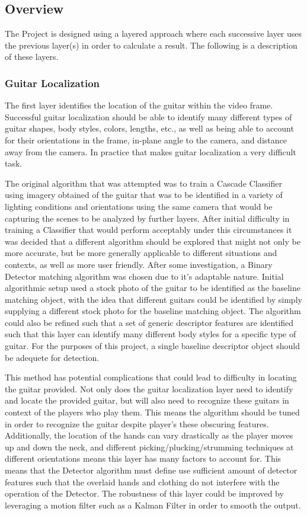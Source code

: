 \subsection{Overview}
The \project Project is designed using a layered approach where each successive layer
uses the previous layer(s) in order to calculate a result.
The following is a description of these layers.
\subsubsection{Guitar Localization}
The first layer identifies the location of the guitar within the video frame.
Successful guitar localization should be able to identify many different types of
guitar shapes, body styles, colors, lengths, etc., as well as being able to account for
their orientations in the frame, in-plane angle to the camera, and distance away from the camera.
In practice that makes guitar localization a very difficult task.
\par
The original algorithm that was attempted was to train a Cascade Classifier using imagery obtained
of the guitar that was to be identified in a variety of lighting conditions and orientations using
the same camera that would be capturing the scenes to be analyzed by further layers.
After initial difficulty in training a Classifier that would perform acceptably under this circumstances
it was decided that a different algorithm should be explored that might not only be more accurate,
but be more generally applicable to different situations and contexts, as well as more user friendly.
After some investigation, a Binary Detector matching algorithm was chosen due to it's adaptable nature.
Initial algorithmic setup used a stock photo of the guitar to be identified as the baseline matching
object, with the idea that different guitars could be identified by simply supplying a different stock
photo for the baseline matching object.
The algorithm could also be refined such that a set of generic descriptor features are identified such
that this layer can identify many different body styles for a specific type of guitar.
For the purposes of this project, a single baseline descriptor object should be adequete for detection.
\par
This method has potential complications that could lead to difficulty in locating the guitar provided.
Not only does the guitar localization layer need to identify and locate the provided guitar,
but will also need to recognize these guitars in context of the players who play them.
This means the algorithm should be tuned in order to recognize the guitar despite player's these obscuring features.
Additionally, the location of the hands can vary drastically as the player moves up and down the neck,
and different picking/plucking/strumming techniques at different orientations
means this layer has many factors to account for.
This means that the Detector algorithm must define use sufficient amount of detector features
such that the overlaid hands and clothing do not interfere with the operation of the Detector.
The robustness of this layer could be improved by leveraging a motion filter such as a Kalman Filter
in order to smooth the output.

